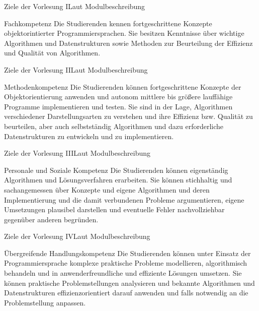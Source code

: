 \begin{frame}{Ziele der Vorlesung I}{Laut Modulbeschreibung}
	\vfill
	\begin{block}{Fachkompetenz}
		Die Studierenden kennen fortgeschrittene Konzepte objektorintierter Programmiersprachen. Sie besitzen Kenntnisse über wichtige Algorithmen und Datenstrukturen sowie Methoden
		zur Beurteilung der Effizienz und Qualität von Algorithmen.
	\end{block}
	\vfill
\end{frame}

\begin{frame}{Ziele der Vorlesung II}{Laut Modulbeschreibung}
	\vfill
	\begin{block}{Methodenkompetenz}
		Die Studierenden können fortgeschrittene Konzepte der Objektorientierung anwenden und autonom mittlere bis größere lauffähige Programme implementieren und testen. Sie sind in der Lage, Algorithmen verschiedener Darstellungsarten zu 
		verstehen und ihre Effizienz bzw. Qualität zu beurteilen, aber auch selbstständig Algorithmen und dazu erforderliche Datenstrukturen zu entwickeln und zu implementieren.
	\end{block}
	\vfill
\end{frame}

\begin{frame}{Ziele der Vorlesung III}{Laut Modulbeschreibung}	
	\vfill
	\begin{block}{Personale und Soziale Kompetenz}
		Die Studierenden können eigenständig Algorithmen und Lösungsverfahren erarbeiten. Sie können stichhaltig und sachangemessen über Konzepte und eigene Algorithmen und deren Implementierung 
		und die damit verbundenen Probleme argumentieren, eigene Umsetzungen plausibel darstellen und eventuelle Fehler nachvollziehbar gegenüber anderen begründen.
	\end{block}
	\vfill
\end{frame}
	
\begin{frame}{Ziele der Vorlesung IV}{Laut Modulbeschreibung}
	\vfill
	\begin{block}{Übergreifende Handlungskompetenz}
		Die Studierenden können unter Einsatz der Programmiersprache komplexe praktische Probleme modellieren, algorithmisch behandeln und in anwenderfreundliche und effiziente Lösungen umsetzen. Sie 
		können praktische Problemstellungen analysieren und bekannte Algorithmen und Datenstrukturen effizienzorientiert darauf anwenden und falls notwendig an die Problemstellung anpassen.
	\end{block}
	\vfill
\end{frame}

